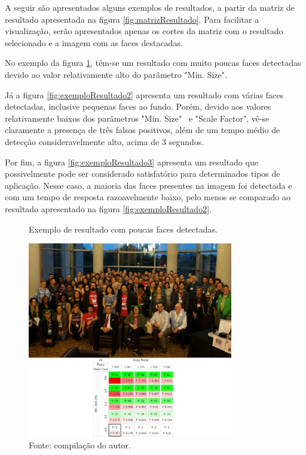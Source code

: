 A seguir são apresentados alguns exemplos de resultados, a partir da matriz de resultado apresentada na figura \ref{fig:matrizResultado}. Para facilitar a visualização, serão apresentados apenas os cortes da matriz com o resultado selecionado e a imagem com as faces destacadas.

No exemplo da figura \ref{fig:exemploResultado1}, têm-se um resultado com muito poucas faces detectadas devido ao valor relativamente alto do parâmetro "Min. Size".

Já a figura \ref{fig:exemploResultado2} apresenta um resultado com várias faces detectadas, inclusive pequenas faces ao fundo. Porém, devido aos valores relativamente baixos dos parâmetros "Min. Size" \ e "Scale Factor", vê-se claramente a presença de três falsos positivos, além de um tempo médio de detecção consideravelmente alto, acima de 3 segundos.

Por fim, a figura \ref{fig:exemploResultado3} apresenta um resultado que possivelmente pode ser considerado satisfatório para determinados tipos de aplicação. Nesse caso, a maioria das faces presentes na imagem foi detectada e com um tempo de resposta razoavelmente baixo, pelo menos se comparado ao resultado apresentado na figura \ref{fig:exemploResultado2}.

\begin{figure}[h]
    \centering
    \caption[Exemplo de resultado com poucas faces detectadas.]{Exemplo de resultado com poucas faces detectadas.}
    \includegraphics[width=0.8\textwidth]{Cap3_Desenvolvimento/Figures/exemplo_resultado_1.jpg}
    \caption*{Fonte: compilação do autor.\footnotemark[\value{footnote}]}
    \label{fig:exemploResultado1}
\end{figure}

